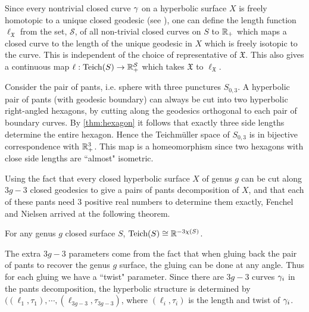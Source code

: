 Since every nontrivial closed curve $\gamma$ on a hyperbolic surface $X$ is freely homotopic to a unique closed geodesic (see \cite{casson}), one can define the length function $\ell_{ \mathfrak{X}}$ from the set, $ \mathcal{S}$, of all non-trivial closed curves on $S$ to $\mathbb{R}_+$ which maps a closed curve to the length of the unique geodesic in $X$ which is freely isotopic to the curve. This is independent of the choice of representative of $ \mathfrak{X}$. This also gives a continuous map $\ell: \text{Teich}(S)\to \mathbb{R}_{+}^{ \mathcal{S}}$ which takes $ \mathfrak{X}$ to $\ell_{ \mathfrak{X}}$.
\begin{exmp}
  Consider the pair of pants, i.e. sphere with three punctures $S_{0,3}$. A hyperbolic pair of pants (with geodesic boundary) can always be cut into two hyperbolic right-angled hexagons, by cutting along the geodesics orthogonal to each pair of boundary curves. By \ref{thm:hexagon} it follows that exactly three side lengths determine the entire hexagon. Hence the Teichm\"{u}ller space of $S_{0,3}$ is in bijective correspondence with $\mathbb{R}_{+}^3$. This map is a homeomorphism since two hexagons with close side lengths are ``almost" isometric.
\end{exmp}
Using the fact that every closed hyperbolic surface $X$ of genus $g$ can be cut along $3g-3$ closed geodesics to give a pairs of pants decomposition of $X$, and that each of these pants need $3$ positive real numbers to determine them exactly, Fenchel and Nielsen arrived at the following theorem.
\begin{theorem}
  For any genus $g$ closed surface $S$, $\text{Teich}(S) \cong \mathbb{R}^{-3\chi(S)}$. 
\end{theorem}
\begin{rem}
The extra $3g-3$ parameters come from the fact that when gluing back the pair of pants to recover the genus $g$ surface, the gluing can be done at any angle. Thus for each gluing we have a ``twist" parameter. Since there are $3g-3$ curves $\gamma_i$ in the pants decomposition, the hyperbolic structure is determined by $((\ell_1,\tau_1),\cdots, (\ell_{3g-3}, \tau_{3g-3})$, where $(\ell_i,\tau_i)$ is the length and twist of $\gamma_i$. 
\end{rem}

